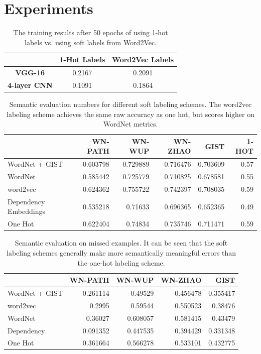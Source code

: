 \section{Experiments}

\begin{table}[!tb]
  \centering
  \begin{tabular}{|c|c|c|}
    \hline
      & \textbf{1-Hot Labels} & \textbf{Word2Vec Labels} \\
    \hline
      \textbf{VGG-16} & 0.2167 & 0.2091 \\
    \hline
      \textbf{4-layer CNN} & 0.1091 & 0.1864 \\
    \hline
  \end{tabular}
  \caption{
    The training results after 50 epochs of using 1-hot labels vs. using soft
    labels from Word2Vec.
  }
  \label{tbl:results}
\end{table}

\begin{table}[t]
    \centering
    \begin{tabular}{lrrrrr}
         & WN-PATH & WN-WUP & WN-ZHAO & GIST & 1-HOT\\
        \hline
        WordNet + GIST & 0.603798 & 0.729889 & 0.716476 & 0.703609 & 0.57\\
        WordNet & 0.585442 & 0.725779 & 0.710825 & 0.678581 & 0.55\\
        word2vec & 0.624362 & 0.755722 & 0.742397 & 0.708035 & 0.59\\
        Dependency Embeddings & 0.535218 & 0.71633 & 0.696365 & 0.652365 &
        0.49\\
        One Hot & 0.622404 & 0.74834 & 0.735746 & 0.711471 & 0.59\\
    \end{tabular}
    \caption{
        Semantic evaluation numbers for different soft labeling schemes. The
        word2vec labeling scheme achieves the same raw accuracy as one hot, but
        scores higher on WordNet metrics.
    }
  \label{tbl:semantic_eval}
\end{table}

\begin{table}[t]
    \centering
    \begin{tabular}{lrrrr}
         & WN-PATH & WN-WUP & WN-ZHAO & GIST\\
        \hline
        WordNet + GIST & 0.261114 & 0.49529 & 0.456478 & 0.355417\\
        word2vec & 0.2995 & 0.59544 & 0.550523 & 0.38476\\
        WordNet & 0.36027 & 0.608057 & 0.581415 & 0.43479\\
        Dependency & 0.091352 & 0.447535 & 0.394429 & 0.331348\\
        One Hot & 0.361664 & 0.566278 & 0.533101 & 0.432775\\
    \end{tabular}
  \label{tbl:semantic_misses}
  \caption{
      Semantic evaluation on missed examples. It can be seen that the soft
      labeling schemes generally make more semantically meaningful errors than
      the one-hot labeling scheme.
  }
\end{table}

